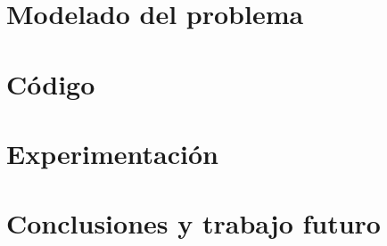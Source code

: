 \documentclass[a4paper]{article}
\begin{document}
\newpage

\section{Modelado del problema}

\newpage

\section{Código}

\newpage

\section{Experimentación}

\newpage

\section{Conclusiones y trabajo futuro} 
\end{document}
